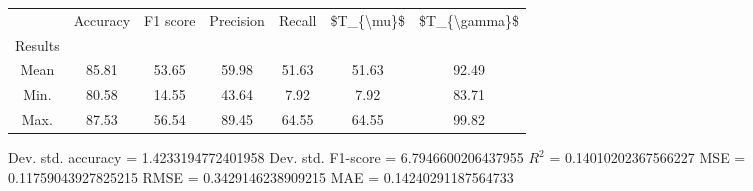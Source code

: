 \begin{tabular}{|c|c|c|c|c|c|c|}
\toprule
{} &  Accuracy &  F1 score &  Precision &  Recall &  \$T\_\{\textbackslash mu\}\$ &  \$T\_\{\textbackslash gamma\}\$ \\
Results &           &           &            &         &            &               \\
\hline
Mean    &     85.81 &     53.65 &      59.98 &   51.63 &      51.63 &         92.49 \\
Min.    &     80.58 &     14.55 &      43.64 &    7.92 &       7.92 &         83.71 \\
Max.    &     87.53 &     56.54 &      89.45 &   64.55 &      64.55 &         99.82 \\
\bottomrule
\end{tabular}

 Dev. std. accuracy = 1.4233194772401958
 Dev. std. F1-score = 6.7946600206437955
 $R^2$ = 0.14010202367566227
 MSE = 0.11759043927825215
 RMSE = 0.3429146238909215
 MAE = 0.14240291187564733